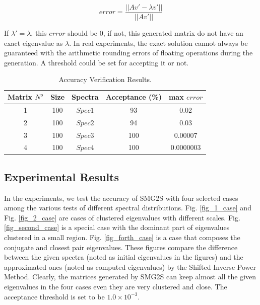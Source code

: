 \begin{equation}
\label{check}
error=
\frac{||Av'-\lambda v'||}{||Av'||}
\end{equation}

If $\lambda' = \lambda$, this $error$ should be $0$, if not, this generated matrix do not have an exact eigenvalue as $\lambda$. In real experiments, the exact solution cannot always be guaranteed with the arithmetic rounding errors of floating operations during the generation. A threshold could be set for accepting it or not.

\begin{table}[htbp]
	\renewcommand{\arraystretch}{1.4}
	\small	
	\caption{Accuracy Verification Results.}
	\label{accuracy}
	\centering
	\begin{tabular}{ccccc}
		\toprule
		Matrix $N^{o}$& Size & Spectra & Acceptance (\%) & max $error$ \\
		\midrule
		1  & 100 & $Spec1$ &93&\num[round-precision=2,round-mode=figures]{0.02}\\
		2 & 100 & $Spec2$   & 94&\num[round-precision=2,round-mode=figures]{0.03}\\
		3 & 100 & $Spec3$  &100&\num[round-precision=2,round-mode=figures]{0.00007}\\
		4 & 100 & $Spec4$  &100&\num[round-precision=2,round-mode=figures]{0.0000003}\\
		\bottomrule
	\end{tabular}
\end{table}

\subsection{Experimental Results}

In the experiments, we test the accuracy of SMG2S with four selected cases among the various tests of different spectral distributions. Fig. \ref{fig_1_case} and Fig. \ref{fig_2_case} are cases of clustered eigenvalues with different scales. Fig. \ref{fig_second_case} is a special case with the dominant part of eigenvalues clustered in a small region. Fig. \ref{fig_forth_case} is a case that composes the conjugate and closest pair eigenvalues. These figures compare the difference between the given spectra (noted as initial eigenvalues in the figures) and the approximated ones (noted as computed eigenvalues) by the Shifted Inverse Power Method. Clearly, the matrices generated by SMG2S can keep almost all the given eigenvalues in the four cases even they are very clustered and close. The acceptance threshold is set to be $1.0\times 10^{-3}$.

